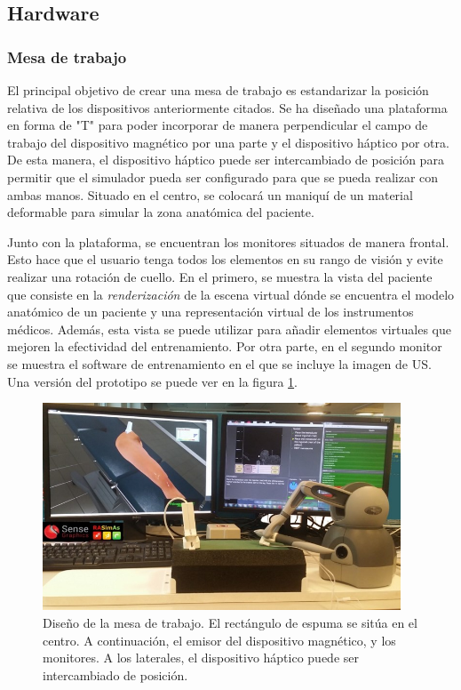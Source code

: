 \subsection{Hardware}


\subsubsection{Mesa de trabajo}

El principal objetivo de crear una mesa de trabajo es estandarizar la posición relativa de los dispositivos anteriormente citados. %
Se ha diseñado una plataforma en forma de "T" para poder incorporar de manera perpendicular el campo de trabajo del dispositivo magnético por una parte y el dispositivo háptico por otra. De esta manera, el dispositivo háptico puede ser intercambiado de posición para permitir que el simulador pueda ser configurado para que se pueda realizar con ambas manos. Situado en el centro, se colocará un maniquí de un material deformable para simular la zona anatómica del paciente. 

Junto con la plataforma, se encuentran los monitores situados de manera frontal. Esto hace que el usuario tenga todos los elementos en su rango de visión y evite realizar una rotación de cuello. En el primero, se muestra la vista del paciente que consiste en la \emph{renderización} de la escena virtual dónde se encuentra el modelo anatómico de un paciente y una representación virtual de los instrumentos médicos. Además, esta vista se puede utilizar para añadir elementos virtuales que mejoren la efectividad del entrenamiento. 
Por otra parte, en el segundo monitor se muestra el software de entrenamiento en el que se incluye la imagen de \ac{US}. Una versión del prototipo se puede ver en la figura \ref{fig:simulator}.


\begin{figure}[ht]
    \centering
    \includegraphics[width=0.95\textwidth]{IMG/simulator.jpg}
    \caption{Diseño de la mesa de trabajo. El rectángulo de espuma se sitúa en el centro. A continuación, el emisor del dispositivo magnético, y los monitores. A los laterales, el dispositivo háptico puede ser intercambiado de posición.}
    \label{fig:simulator}
\end{figure}


